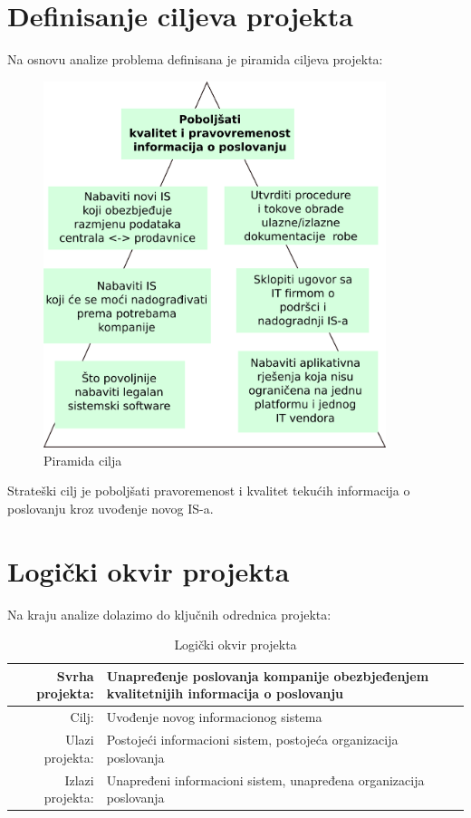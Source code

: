\documentclass[times, utf8, seminar]{fit}
\begin{document}
\pagebreak
\section{Definisanje ciljeva projekta}
Na osnovu analize problema definisana je piramida ciljeva projekta: 

\begin{figure}[H]
\centering
\includegraphics[width=10cm]{img/piramida_cilja.png}
\caption{Piramida cilja}
\end{figure}

Strateški cilj je poboljšati pravoremenost i kvalitet tekućih informacija o poslovanju kroz uvođenje novog IS-a. 

\section{Logički okvir projekta}
Na kraju analize dolazimo do ključnih odrednica projekta:
\begin{table}[h]
\resizebox{15cm}{!} {
\begin{tabular}{ | r | l | }
\hline
Svrha projekta: & Unapređenje poslovanja kompanije obezbjeđenjem kvalitetnijih informacija o poslovanju \\ \hline
Cilj: & Uvođenje novog informacionog sistema \\ \hline
Ulazi projekta: & Postojeći informacioni sistem, postojeća organizacija poslovanja \\ \hline
Izlazi projekta: & Unapređeni informacioni sistem, unapređena organizacija poslovanja \\ \hline
\end{tabular}
}

\caption{Logički okvir projekta}
\end{table}
\end{document}

